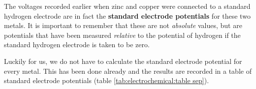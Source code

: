 The voltages recorded earlier when zinc and copper were connected to a standard hydrogen electrode are in fact the \textbf{standard electrode potentials} for these two metals. It is important to remember that these are not \textit{absolute} values, but are potentials that have been measured \textit{relative} to the potential of hydrogen if the standard hydrogen electrode is taken to be zero. 


Luckily for us, we do not have to calculate the standard electrode potential for every metal. This has been done already and the results are recorded in a table of standard electrode potentials (table \ref{tab:electrochemical:table sep}).\\

